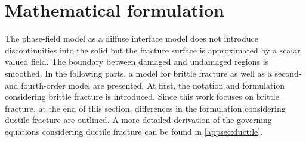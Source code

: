 \section{Mathematical formulation} \label{sec:formul}
The phase-field model as a diffuse interface model does not introduce discontinuities into the solid but the fracture surface is approximated by a scalar valued field. The boundary between damaged and undamaged regions is smoothed. In the following parts, a model for brittle fracture as well as a second- and fourth-order model are presented. At first, the notation and formulation considering brittle fracture is introduced. Since this work focuses on brittle fracture, at the end of this section, differences in the formulation considering ductile fracture are outlined. A more detailed derivation of the governing equations considering ductile fracture can be found in \ref{appsec:ductile}. 

